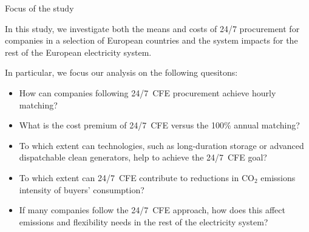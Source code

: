 \begin{frame}{Focus of the study}
  
  In this study, we investigate both the \alert{means and costs of 24/7 procurement} 
  for companies in a selection of European countries 
  and the \alert{system impacts} for the rest of the European electricity system. 
  
  In particular, we focus our analysis on the following quesitons:

    \begin{itemize}
    \item How can companies following 24/7~CFE procurement achieve hourly matching?
    \item What is the cost premium of 24/7~CFE versus the 100\% annual matching?
    \item To which extent can technologies, such as long-duration storage or advanced dispatchable
          clean generators, help to achieve the 24/7~CFE goal?
    \item To which extent can 24/7~CFE contribute to reductions in CO$_2$
          emissions intensity of buyers' consumption? 
    \item If many companies follow the 24/7~CFE approach, how does this affect 
    emissions and flexibility needs in the rest of the electricity system?
    \end{itemize}
  
\end{frame}




